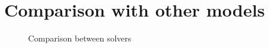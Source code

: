 \documentclass[a4paper,11pt,oneside]{report}
\theoremstyle{named}
\begin{document}
\section{Comparison with other models}

\begin{figure}
    \centering
    \caption{Comparison between solvers}
    \label{fig:comparison}
\end{figure}
\end{document}
